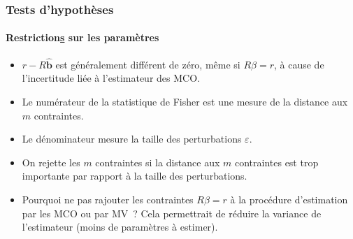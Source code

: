 \documentclass[10pt]{beamer}
\begin{document}
\begin{frame}
  \frametitle{Tests d'hypothèses}
  \framesubtitle{Restriction\underline{s} sur les paramètres}

  \begin{itemize}

  \item $r-R\hat{\mathbf b}$ est généralement différent de zéro, même
    si $R\beta = r$, à cause de l'incertitude liée à l'estimateur des
    MCO.\newline

  \item Le numérateur de la statistique de Fisher est une mesure de la distance aux $m$ contraintes.\newline

  \item Le dénominateur mesure la taille des perturbations $\varepsilon$.\newline

  \item On rejette les $m$ contraintes si la distance aux $m$ contraintes est trop importante par rapport à la taille des perturbations.\newline

  \item Pourquoi ne pas rajouter les contraintes $R\beta=r$ à la procédure d'estimation par les MCO ou par MV~? Cela permettrait de réduire la variance de l'estimateur (moins de paramètres à estimer).

  \end{itemize}

\end{frame}
\end{document}
